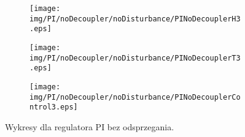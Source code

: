 \begin{figure}[h!]
   \centering
   \begin{subfigure}[b]{0.4\textwidth}
      \texttt{[image: img/PI/noDecoupler/noDisturbance/PINoDecouplerH3.eps]}
      \caption{}
      \label{fig:fig:PINodDecoupler31}
   \end{subfigure}
       
   \begin{subfigure}[b]{0.4\textwidth}
      \texttt{[image: img/PI/noDecoupler/noDisturbance/PINoDecouplerT3.eps]}
      \caption{}
      \label{fig:fig:PINodDecoupler32}
   \end{subfigure}
       
   \begin{subfigure}[b]{0.4\textwidth}
      \texttt{[image: img/PI/noDecoupler/noDisturbance/PINoDecouplerControl3.eps]}
      \caption{}
      \label{fig:fig:PINodDecoupler33}
   \end{subfigure}
       
   \caption{Wykresy dla regulatora PI bez odsprzegania.}
   \label{fig:PINodDecoupler3}
\end{figure}
           
